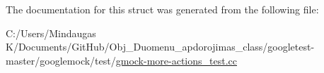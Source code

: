 The documentation for this struct was generated from the following file\+:\begin{DoxyCompactItemize}
\item 
C\+:/\+Users/\+Mindaugas K/\+Documents/\+Git\+Hub/\+Obj\+\_\+\+Duomenu\+\_\+apdorojimas\+\_\+class/googletest-\/master/googlemock/test/\mbox{\hyperlink{googletest-master_2googlemock_2test_2gmock-more-actions__test_8cc}{gmock-\/more-\/actions\+\_\+test.\+cc}}\end{DoxyCompactItemize}
